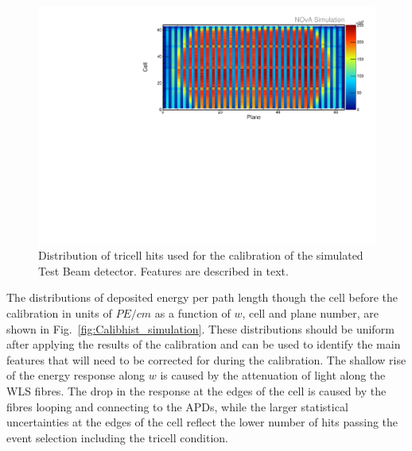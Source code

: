\begin{figure}[h]
\centering
\includegraphics[width=\textwidth]{Plots/TBCalibration/Attenprofs_Simulation_CellPlane.pdf}
\caption[Plane-Cell distribution of hits for the simulation sample]{Distribution of tricell hits used for the calibration of the simulated Test Beam detector. Features are described in text.}
\label{fig:CalibhistSim}
\end{figure}

The distributions of deposited energy per path length though the cell before the calibration in units of $\unit{PE/cm}$ as a function of $w$, cell and plane number, are shown in Fig.~\ref{fig:Calibhist_simulation}. These distributions should be uniform after applying the results of the calibration and can be used to identify the main features that will need to be corrected for during the calibration. The shallow rise of the energy response along $w$ is caused by the attenuation of light along the \gls{WLS} fibres. The drop in the response at the edges of the cell is caused by the fibres looping and connecting to the \glspl{APD}, while the larger statistical uncertainties at the edges of the cell reflect the lower number of hits passing the event selection including the tricell condition.

